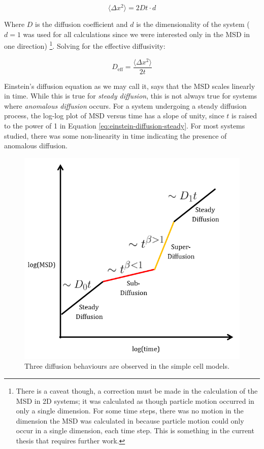 	\begin{equation}
	\label{eq:einstein-diffusion-steady}
		\langle \Delta x^2 \rangle = 2Dt \cdot d
	\end{equation}
		
	Where $ D $ is the diffusion coefficient and $ d $ is the dimensionality of the system ($ d = 1 $ was used for all calculations since we were interested only in the MSD in one direction) \footnote{There is a caveat though, a correction must be made in the calculation of the MSD in 2D systems; it was calculated as though particle motion occurred in only a single dimension. For some time steps, there was no motion in the dimension the MSD was calculated in because particle motion could only occur in a single dimension, each time step. This is something in the current thesis that requires further work.}. Solving for the effective diffusivity:
	
	\begin{equation}
		D_\textrm{eff} = \dfrac{\langle \Delta x^2 \rangle}{2t}
	\end{equation}	
	
	Einstein's diffusion equation as we may call it, says that the MSD scales linearly in time. While this is true for \textsl{steady diffusion}, this is not always true for systems where \textsl{anomalous diffusion} occurs. For a system undergoing a steady diffusion process, the log-log plot of MSD versus time has a slope of unity, since $ t $ is raised to the power of 1 in Equation \ref{eq:einstein-diffusion-steady}. For most systems studied, there was some non-linearity in time indicating the presence of anomalous diffusion. 
		
	\begin{figure}[h]
		\centering
		\includegraphics[width=0.7\linewidth]{../images/diffusion-regime}
		\caption[Diffusion regimes observed]{Three diffusion behaviours are observed in the simple cell models.}
		\label{fig:diffusion-regime}
	\end{figure}

